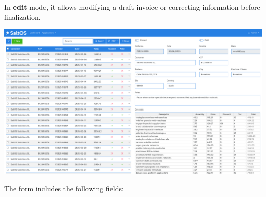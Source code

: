 \documentclass[a4paper]{article}
\begin{document}
In \textbf{edit} mode, it allows modifying a draft invoice or correcting information before finalization.

\begin{center}\includegraphics[width=1\textwidth]{../ujest/snaps/test-screenshots-js-screenshots-sales-invoices-edit-100-en-us-1-snap.png}\end{center}

The form includes the following fields:
\end{document}
